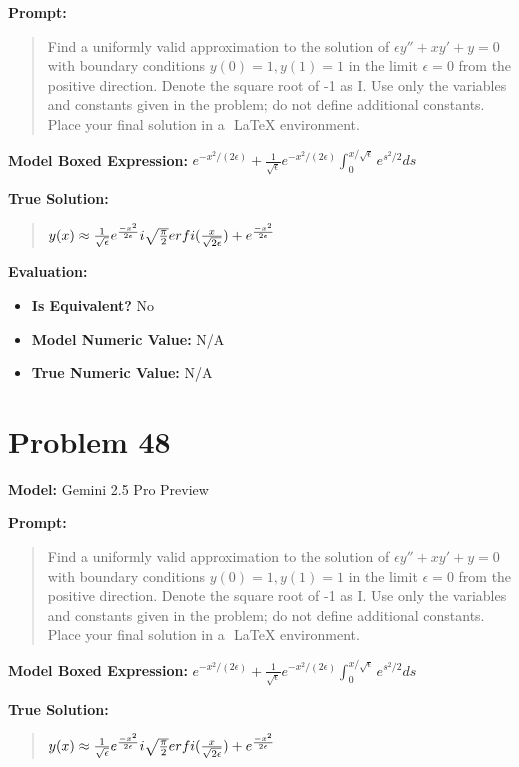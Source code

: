 \documentclass{article}
\begin{document}
\textbf{Prompt:}
\begin{quote}
Find a uniformly valid approximation to the solution of $\epsilon y'' + x y' + y = 0$ with boundary conditions $y(0)=1, y(1)=1$ in the limit $\epsilon = 0$ from the positive direction. Denote the square root of -1 as I. Use only the variables and constants given in the problem; do not define additional constants. Place your final solution in a $\boxed{}$ LaTeX environment.
\end{quote}
\textbf{Model Boxed Expression:} $e^{-x^2/(2\epsilon)} + \frac{1}{\sqrt{\epsilon}} e^{-x^2/(2\epsilon)} \int_0^{x/\sqrt{\epsilon}} e^{s^2/2} ds$

\textbf{True Solution:}
\begin{quote}
$y(x) \approx \frac{1}{\sqrt{\epsilon}}e^{\frac{-x^2}{2\epsilon}} \\i \sqrt{\frac{\pi}{2}}erfi(\frac{x}{\sqrt{2\epsilon}})+ e^{\frac{-x^2}{2\epsilon}}$
\end{quote}

\textbf{Evaluation:}
\begin{itemize}
\item \textbf{Is Equivalent?} No
\item \textbf{Model Numeric Value:} N/A
\item \textbf{True Numeric Value:} N/A
\end{itemize}
\vspace{1cm}
\section*{Problem 48}
\textbf{Model:} Gemini 2.5 Pro Preview

\textbf{Prompt:}
\begin{quote}
Find a uniformly valid approximation to the solution of $\epsilon y'' + x y' + y = 0$ with boundary conditions $y(0)=1, y(1)=1$ in the limit $\epsilon = 0$ from the positive direction. Denote the square root of -1 as I. Use only the variables and constants given in the problem; do not define additional constants. Place your final solution in a $\boxed{}$ LaTeX environment.
\end{quote}
\textbf{Model Boxed Expression:} $e^{-x^2/(2\epsilon)} + \frac{1}{\sqrt{\epsilon}} e^{-x^2/(2\epsilon)} \int_0^{x/\sqrt{\epsilon}} e^{s^2/2} ds$

\textbf{True Solution:}
\begin{quote}
$y(x) \approx \frac{1}{\sqrt{\epsilon}}e^{\frac{-x^2}{2\epsilon}} \\i \sqrt{\frac{\pi}{2}}erfi(\frac{x}{\sqrt{2\epsilon}})+ e^{\frac{-x^2}{2\epsilon}}$
\end{quote}
\end{document}
